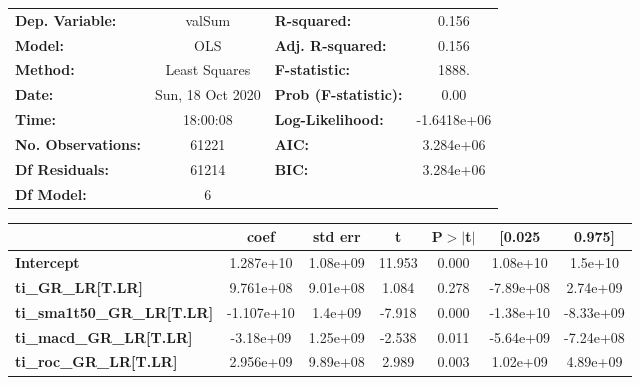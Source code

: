 \begin{center}
\begin{tabular}{lclc}
\toprule
\textbf{Dep. Variable:}                 &      valSum      & \textbf{  R-squared:         } &      0.156   \\
\textbf{Model:}                         &       OLS        & \textbf{  Adj. R-squared:    } &      0.156   \\
\textbf{Method:}                        &  Least Squares   & \textbf{  F-statistic:       } &      1888.   \\
\textbf{Date:}                          & Sun, 18 Oct 2020 & \textbf{  Prob (F-statistic):} &      0.00    \\
\textbf{Time:}                          &     18:00:08     & \textbf{  Log-Likelihood:    } & -1.6418e+06  \\
\textbf{No. Observations:}              &       61221      & \textbf{  AIC:               } &  3.284e+06   \\
\textbf{Df Residuals:}                  &       61214      & \textbf{  BIC:               } &  3.284e+06   \\
\textbf{Df Model:}                      &           6      & \textbf{                     } &              \\
\bottomrule
\end{tabular}
\begin{tabular}{lcccccc}
                                        & \textbf{coef} & \textbf{std err} & \textbf{t} & \textbf{P$> |$t$|$} & \textbf{[0.025} & \textbf{0.975]}  \\
\midrule
\textbf{Intercept}                      &    1.287e+10  &     1.08e+09     &    11.953  &         0.000        &     1.08e+10    &      1.5e+10     \\
\textbf{ti\_GR\_LR[T.LR]}               &    9.761e+08  &     9.01e+08     &     1.084  &         0.278        &    -7.89e+08    &     2.74e+09     \\
\textbf{ti\_sma1t50\_GR\_LR[T.LR]}      &   -1.107e+10  &      1.4e+09     &    -7.918  &         0.000        &    -1.38e+10    &    -8.33e+09     \\
\textbf{ti\_macd\_GR\_LR[T.LR]}         &    -3.18e+09  &     1.25e+09     &    -2.538  &         0.011        &    -5.64e+09    &    -7.24e+08     \\
\textbf{ti\_roc\_GR\_LR[T.LR]}          &    2.956e+09  &     9.89e+08     &     2.989  &         0.003        &     1.02e+09    &     4.89e+09     \\

\end{tabular}
\end{center}
